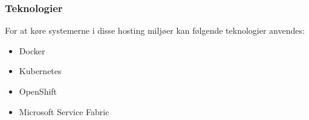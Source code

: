 \subsubsection{Teknologier}
For at køre systemerne i disse hosting miljøer kan følgende teknologier anvendes:

\begin{itemize}
	\item Docker
	\item Kubernetes
	\item OpenShift
	\item Microsoft Service Fabric
\end{itemize}
